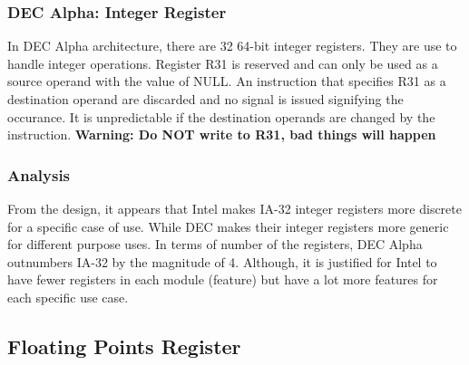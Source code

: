 \documentclass[letterpaper,10pt,titlepage]{article}
\begin{document}

\subsubsection{DEC Alpha: Integer Register}
In DEC Alpha architecture, there are 32 64-bit integer registers. They are use
to handle integer operations. Register R31 is reserved and can only be used as 
a source operand with the value of NULL. An instruction that specifies R31 as 
a destination operand are discarded and no signal is issued signifying the 
occurance. It is unpredictable if the destination operands are changed by
the instruction. \textbf{Warning: Do NOT write to R31, bad things will happen}

\subsubsection{Analysis}
From the design, it appears that Intel makes IA-32 integer registers more 
discrete for a specific case of use. While DEC makes their integer registers 
more generic for different purpose uses. In terms of number of the registers,
DEC Alpha outnumbers IA-32 by the magnitude of 4. Although, it is justified
for Intel to have fewer registers in each module (feature) but have a lot more
features for each specific use case.


\subsection{Floating Points Register}
\end{document}
